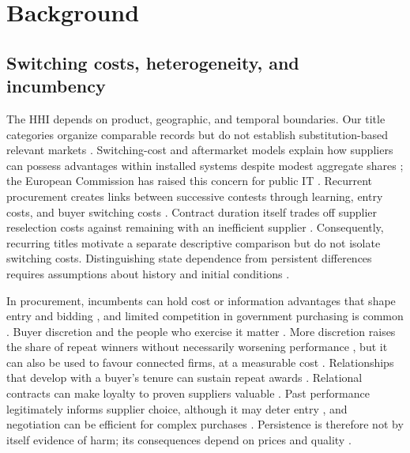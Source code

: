 \documentclass[pdflatex,sn-apa]{sn-jnl}
\begin{document}
\section{Background}\label{sec:background}

\subsection{Switching costs, heterogeneity, and incumbency}
The HHI depends on product, geographic, and temporal boundaries. Our title categories organize comparable records but do not establish substitution-based relevant markets \citep{rhoades1993,ECMarketDefinition2024}. Switching-cost and aftermarket models explain how suppliers can possess advantages within installed systems despite modest aggregate shares \citep{Klemperer1987,FarrellShapiro1988,Shapiro1995,BorensteinMackieMasonNetz2000,ShapiroVarian1999}; the European Commission has raised this concern for public IT \citep{EC2013AgainstLockin}. Recurrent procurement creates links between successive contests through learning, entry costs, and buyer switching costs \citep{IossaWaterson2019}. Contract duration itself trades off supplier reselection costs against remaining with an inefficient supplier \citep{MacKay2022}. Consequently, recurring titles motivate a separate descriptive comparison but do not isolate switching costs. Distinguishing state dependence from persistent differences requires assumptions about history and initial conditions \citep{HeckmanBorjas1980,Heckman1981,Keane1997,Dube2010,Wooldridge2005}.

In procurement, incumbents can hold cost or information advantages that shape entry and bidding \citep{JofreBonetPesendorfer2003,DeSilvaDunneKosmopoulou2003,LiZheng2009,Saini2012,Hyytinen2018}, and limited competition in government purchasing is common \citep{KangMiller2022}. Buyer discretion and the people who exercise it matter \citep{BestHjortSzakonyi2023}. More discretion raises the share of repeat winners without necessarily worsening performance \citep{Coviello2018}, but it can also be used to favour connected firms, at a measurable cost \citep{Baltrunaite2021,Szucs2024,PalgutaPertold2017,BaranekTitl2024,DecarolisFismanPinottiVannutelli}. Relationships that develop with a buyer's tenure can sustain repeat awards \citep{CovielloGagliarducci2017}. Relational contracts can make loyalty to proven suppliers valuable \citep{Board2011,CalzolariSpagnolo}. Past performance legitimately informs supplier choice, although it may deter entry \citep{DecarolisPaciniSpagnolo2016,Butler2020}, and negotiation can be efficient for complex purchases \citep{Bajari2009}. Persistence is therefore not by itself evidence of harm; its consequences depend on prices and quality \citep{BandieraPratValletti2009}.
\end{document}
